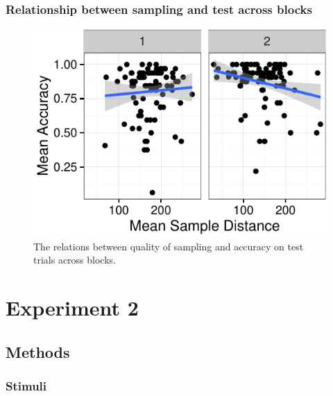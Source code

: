\documentclass[10pt, letterpaper]{article}
\newenvironment{CodeChunk}{}{}
\begin{document}
\subsubsection{Relationship between sampling and test across
blocks}\label{relationship-between-sampling-and-test-across-blocks}

\begin{CodeChunk}
\captionsetup{width=0.8\columnwidth}\begin{figure}[h]

{\centering \includegraphics{figs/exp1_sampling-acc-plot-1} 

}

\caption[The relations between quality of sampling and accuracy on test trials across blocks]{The relations between quality of sampling and accuracy on test trials across blocks.}\label{fig:exp1_sampling-acc-plot}
\end{figure}
\end{CodeChunk}

\section{Experiment 2}\label{experiment-2}

\subsection{Methods}\label{methods-2}

\subsubsection{Stimuli}\label{stimuli-2}
\end{document}
